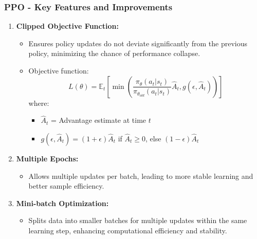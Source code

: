 \documentclass[aspectratio=169]{beamer}
\begin{document}
\begin{frame}[fragile]
  \frametitle{PPO - Key Features and Improvements}
  
  \begin{enumerate}
    \item \textbf{Clipped Objective Function:} 
      \begin{itemize}
        \item Ensures policy updates do not deviate significantly from the previous policy, minimizing the chance of performance collapse.
        \item Objective function:
        \begin{equation}
          L(\theta) = \mathbb{E}_t \left[ \min\left(\frac{\pi_\theta(a_t|s_t)}{\pi_{\theta_{old}}(a_t|s_t)} \hat{A}_t, g(\epsilon, \hat{A}_t)\right)\right]
        \end{equation}
        where:
        \begin{itemize}
          \item \( \hat{A}_t \) = Advantage estimate at time \( t \)
          \item \( g(\epsilon, \hat{A}_t) = (1 + \epsilon) \hat{A}_t \) if \( \hat{A}_t \geq 0 \), else \( (1 - \epsilon) \hat{A}_t \)
        \end{itemize}
      \end{itemize}
    
    \item \textbf{Multiple Epochs:} 
      \begin{itemize}
        \item Allows multiple updates per batch, leading to more stable learning and better sample efficiency.
      \end{itemize}
    
    \item \textbf{Mini-batch Optimization:} 
      \begin{itemize}
        \item Splits data into smaller batches for multiple updates within the same learning step, enhancing computational efficiency and stability.
      \end{itemize}
  \end{enumerate}
\end{frame}
\end{document}
